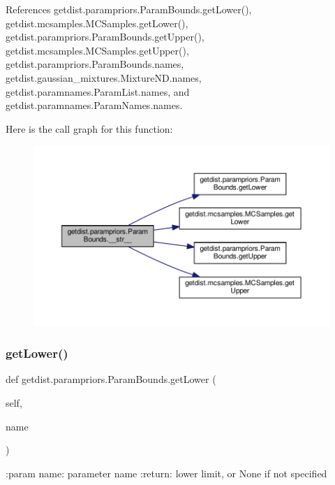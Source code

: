 References getdist.\+parampriors.\+Param\+Bounds.\+get\+Lower(), getdist.\+mcsamples.\+M\+C\+Samples.\+get\+Lower(), getdist.\+parampriors.\+Param\+Bounds.\+get\+Upper(), getdist.\+mcsamples.\+M\+C\+Samples.\+get\+Upper(), getdist.\+parampriors.\+Param\+Bounds.\+names, getdist.\+gaussian\+\_\+mixtures.\+Mixture\+N\+D.\+names, getdist.\+paramnames.\+Param\+List.\+names, and getdist.\+paramnames.\+Param\+Names.\+names.

Here is the call graph for this function\+:
\nopagebreak
\begin{figure}[H]
\begin{center}
\leavevmode
\includegraphics[width=350pt]{classgetdist_1_1parampriors_1_1ParamBounds_abeb92238dd9592bdc946de9c849f7275_cgraph}
\end{center}
\end{figure}
\mbox{\label{classgetdist_1_1parampriors_1_1ParamBounds_ad03ae510837b1fccf9ff40264b2c6e90}} 
\subsubsection{\texorpdfstring{get\+Lower()}{getLower()}}
{\footnotesize\ttfamily def getdist.\+parampriors.\+Param\+Bounds.\+get\+Lower (\begin{DoxyParamCaption}\item[{}]{self,  }\item[{}]{name }\end{DoxyParamCaption})}

\begin{DoxyVerb}:param name: parameter name
:return: lower limit, or None if not specified
\end{DoxyVerb}
 

